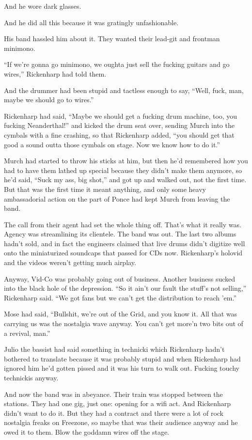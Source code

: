 And he wore dark glasses.

And he did all this because it was gratingly unfashionable.

His band hassled him about it. They wanted their lead-git and frontman minimono.

``If we're gonna go minimono, we oughta just sell the fucking guitars and go wires,'' Rickenharp had told them.

And the drummer had been stupid and tactless enough to say, ``Well, fuck, man, maybe we should go to wires.''

Rickenharp had said, ``Maybe we should get a fucking drum machine, too, you fucking Neanderthal!'' and kicked the drum seat over, sending Murch into the cymbals with a fine crashing, so that Rickenharp added, ``you should get that good a sound outta those cymbals on stage. Now we know how to do it.''

Murch had started to throw his sticks at him, but then he'd remembered how you had to have them lathed up special because they didn't make them anymore, so he'd said, ``Suck my ass, big shot,'' and got up and walked out, not the first time. But that was the first time it meant anything, and only some heavy ambassadorial action on the part of Ponce had kept Murch from leaving the band.

The call from their agent had set the whole thing off. That's what it really was. Agency was streamlining its clientele. The band was out. The last two albums hadn't sold, and in fact the engineers claimed that live drums didn't digitize well onto the miniaturized soundcaps that passed for CDs now. Rickenharp's holovid and the videos weren't getting much airplay.

Anyway, Vid-Co was probably going out of business. Another business sucked into the black hole of the depression. ``So it ain't our fault the stuff's not selling,'' Rickenharp said. ``We got fans but we can't get the distribution to reach 'em.''

Mose had said, ``Bullshit, we're out of the Grid, and you know it. All that was carrying us was the nostalgia wave anyway. You can't get more'n two bits out of a revival, man.''

Julio the bassist had said something in technicki which Rickenharp hadn't bothered to translate because it was probably stupid and when Rickenharp had ignored him he'd gotten pissed and it was his turn to walk out. Fucking touchy technickis anyway.

And now the band was in abeyance. Their train was stopped between the stations. They had one gig, just one: opening for a wifi act. And Rickenharp didn't want to do it. But they had a contract and there were a lot of rock nostalgia freaks on Freezone, so maybe that was their audience anyway and he owed it to them. Blow the goddamn wires off the stage.

